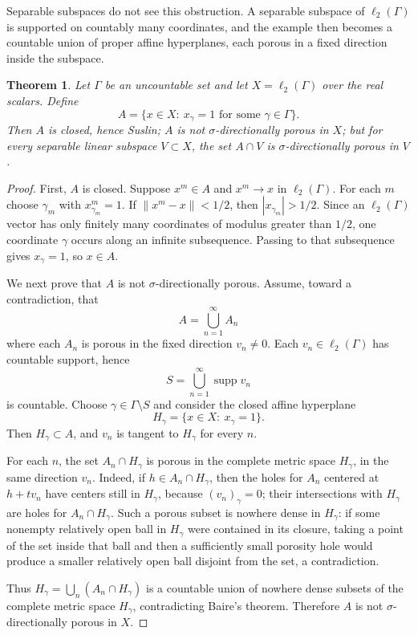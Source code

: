\documentclass[11pt]{article}
\newtheorem{theorem}{Theorem}
\newcommand{\supp}{\operatorname{supp}}
\begin{document}
Separable subspaces do not see this obstruction.  A separable subspace of
$\ell_2(\Gamma)$ is supported on countably many coordinates, and the example
then becomes a countable union of proper affine hyperplanes, each porous in a
fixed direction inside the subspace.

\begin{theorem}
Let $\Gamma$ be an uncountable set and let
$X=\ell_2(\Gamma)$ over the real scalars.  Define
\[
  A=\{x\in X:\ x_\gamma=1\text{ for some }\gamma\in\Gamma\}.
\]
Then $A$ is closed, hence Suslin; $A$ is not $\sigma$-directionally porous in
$X$; but for every separable linear subspace $V\subset X$, the set
$A\cap V$ is $\sigma$-directionally porous in $V$.
\end{theorem}

\begin{proof}
First, $A$ is closed.  Suppose $x^m\in A$ and $x^m\to x$ in $\ell_2(\Gamma)$.
For each $m$ choose $\gamma_m$ with $x^m_{\gamma_m}=1$.  If
$\|x^m-x\|<1/2$, then $|x_{\gamma_m}|>1/2$.  Since an $\ell_2(\Gamma)$ vector
has only finitely many coordinates of modulus greater than $1/2$, one
coordinate $\gamma$ occurs along an infinite subsequence.  Passing to that
subsequence gives $x_\gamma=1$, so $x\in A$.

We next prove that $A$ is not $\sigma$-directionally porous.  Assume, toward a
contradiction, that
\[
  A=\bigcup_{n=1}^\infty A_n
\]
where each $A_n$ is porous in the fixed direction $v_n\neq 0$.  Each
$v_n\in\ell_2(\Gamma)$ has countable support, hence
\[
  S=\bigcup_{n=1}^\infty \supp v_n
\]
is countable.  Choose $\gamma\in\Gamma\setminus S$ and consider the closed
affine hyperplane
\[
  H_\gamma=\{x\in X:\ x_\gamma=1\}.
\]
Then $H_\gamma\subset A$, and $v_n$ is tangent to $H_\gamma$ for every $n$.

For each $n$, the set $A_n\cap H_\gamma$ is porous in the complete metric
space $H_\gamma$, in the same direction $v_n$.  Indeed, if
$h\in A_n\cap H_\gamma$, then the holes for $A_n$ centered at
$h+t v_n$ have centers still in $H_\gamma$, because $(v_n)_\gamma=0$; their
intersections with $H_\gamma$ are holes for $A_n\cap H_\gamma$.
Such a porous subset is nowhere dense in $H_\gamma$: if some nonempty
relatively open ball in $H_\gamma$ were contained in its closure, taking a
point of the set inside that ball and then a sufficiently small porosity hole
would produce a smaller relatively open ball disjoint from the set, a
contradiction.

Thus $H_\gamma=\bigcup_n(A_n\cap H_\gamma)$ is a countable union of nowhere
dense subsets of the complete metric space $H_\gamma$, contradicting Baire's
theorem.  Therefore $A$ is not $\sigma$-directionally porous in $X$.


\end{proof}
\end{document}
